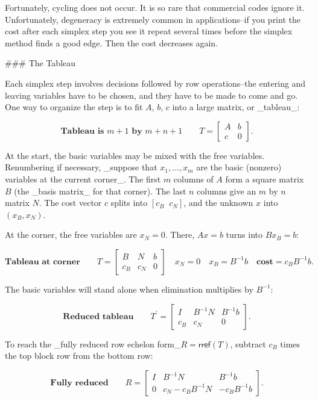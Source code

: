 Fortunately, cycling does not occur. It is so rare that commercial codes ignore it. Unfortunately, degeneracy is extremely common in applications--if you print the cost after each simplex step you see it repeat several times before the simplex method finds a good edge. Then the cost decreases again.

### The Tableau

Each simplex step involves decisions followed by row operations--the entering and leaving variables have to be chosen, and they have to be made to come and go. One way to organize the step is to fit \(A\), \(b\), \(c\) into a large matrix, or _tableau_:

\[\textbf{Tableau is }m+1\textbf{ by }m+n+1\qquad T=\begin{bmatrix}A&b\\ c&0\end{bmatrix}.\]

At the start, the basic variables may be mixed with the free variables. Renumbering if necessary, _suppose that \(x_{1},\ldots,x_{m}\) are the basic (nonzero) variables at the current corner_. The first \(m\) columns of \(A\) form a square matrix \(B\) (the _basis matrix_ for that corner). The last \(n\) columns give an \(m\) by \(n\) matrix \(N\). The cost vector \(c\) splits into \([c_{B}\;\;c_{N}]\), and the unknown \(x\) into \((x_{B},x_{N})\).

At the corner, the free variables are \(x_{N}=0\). There, \(Ax=b\) turns into \(Bx_{B}=b\):

\[\textbf{Tableau at corner}\qquad T=\begin{bmatrix}B&N&b\\ c_{B}&c_{N}&0\end{bmatrix}\quad x_{N}=0\quad x_{B}=B^{-1}b\quad\textbf{cost}=c _{B}B^{-1}b.\]

The basic variables will stand alone when elimination multiplies by \(B^{-1}\):

\[\textbf{Reduced tableau}\qquad T^{\prime}=\begin{bmatrix}I&B^{-1}N&B^{-1}b\\ c_{B}&c_{N}&0\end{bmatrix}.\]

To reach the _fully reduced row echelon form_\(R=\mathsf{rref}(T)\), subtract \(c_{B}\) times the top block row from the bottom row:

\[\textbf{Fully reduced}\qquad R=\begin{bmatrix}I&B^{-1}N&B^{-1}b\\ 0&c_{N}-c_{B}B^{-1}N&-c_{B}B^{-1}b\end{bmatrix}.\]

